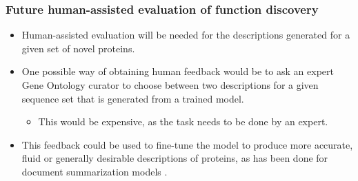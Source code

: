 \documentclass{beamer}
\begin{document}


\begin{frame}
\frametitle{Future human-assisted evaluation of function discovery}
\begin{itemize}
    \item Human-assisted evaluation will be needed for the descriptions generated for a given set of novel proteins.\pause
    \item One possible way of obtaining human feedback would be to ask an expert Gene Ontology curator to choose between two descriptions for a given sequence set that is generated from a trained model.\pause
        \begin{itemize}
            \item This would be expensive, as the task needs to be done by an expert.\pause
        \end{itemize}
    \item This feedback could be used to fine-tune the model to produce more accurate, fluid or generally desirable descriptions of proteins, as has been done for document summarization models .
\end{itemize}
\end{frame}
\end{document}
